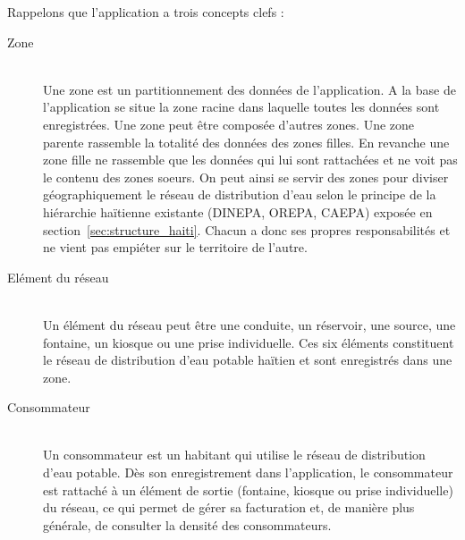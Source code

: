 \documentclass{EPL-master-thesis-covers-FR}
\begin{document}

				Rappelons que l'application a trois concepts clefs :
				\begin{description}
					\item[Zone] \hfill \\
						Une zone est un partitionnement des données de l'application. A la base de l'application se situe la zone racine dans laquelle toutes les données sont enregistrées. Une zone peut être composée d'autres zones. Une zone parente rassemble la totalité des données des zones filles. En revanche une zone fille ne rassemble que les données qui lui sont rattachées et ne voit pas le contenu des zones soeurs. On peut ainsi se servir des zones pour diviser géographiquement le réseau de distribution d'eau selon le principe de la hiérarchie haïtienne existante (DINEPA, OREPA, CAEPA) exposée en section~\ref{sec:structure_haiti}. Chacun a donc ses propres responsabilités et ne vient pas empiéter sur le territoire de l'autre.
					\item[Elément du réseau] \hfill \\
						Un élément du réseau peut être une conduite, un réservoir, une source, une fontaine, un kiosque ou une prise individuelle. Ces six éléments constituent le réseau de distribution d'eau potable haïtien et sont enregistrés dans une zone.
					\item[Consommateur] \hfill \\
						Un consommateur est un habitant qui utilise le réseau de distribution d'eau potable. Dès son enregistrement dans l'application, le consommateur est rattaché à un élément de sortie (fontaine, kiosque ou prise individuelle) du réseau, ce qui permet de gérer sa facturation et, de manière plus générale, de consulter la densité des consommateurs.
				\end{description}
\end{document}
